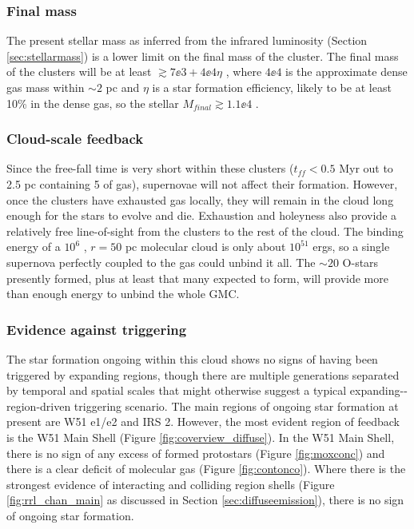 \subsubsection{Final mass}
The present stellar mass as inferred from the infrared luminosity (Section
\ref{sec:stellarmass}) is a lower limit on the final mass of the cluster.  The
final mass of the clusters will be at least $\gtrsim7\ee{3} + 4\ee{4} \eta$ \msun,
where $4\ee{4}$ \msun is the approximate dense gas mass within $\sim2$ pc and
$\eta$ is a star formation efficiency, likely to be at least 10\% in the dense
gas, so the stellar $M_{final} \gtrsim 1.1\ee{4}$ \msun.

\subsubsection{Cloud-scale feedback}
Since the free-fall time is very short within these clusters ($t_{ff} < 0.5$
Myr out to 2.5 pc containing 5 \msun of gas), supernovae will not affect
their formation.  However, once the clusters have exhausted gas locally, they
will remain in the cloud long enough for the stars to evolve and die.
Exhaustion and holeyness also provide a relatively free line-of-sight from the
clusters to the rest
of the cloud.  The binding energy of a $10^6$ \msun, $r=50$ pc 
molecular cloud is only about $10^{51}$ ergs, so a single supernova perfectly
coupled to the gas could unbind it all.  The $\sim20$ O-stars presently formed,
plus at least that many expected to form, will provide more than enough energy
to unbind the whole GMC.

\subsubsection{Evidence against triggering}
The star formation ongoing within this cloud shows no signs of having been
triggered by expanding \hii regions, though there are multiple generations
separated by temporal and spatial scales that might otherwise suggest a typical
expanding-\hii-region-driven triggering
scenario.  The main regions of ongoing star formation at present are W51 e1/e2
and IRS 2.  However, the most evident region of feedback is the W51 Main Shell
(Figure \ref{fig:coverview_diffuse}).  In the W51 Main Shell, there is no sign
of any excess of formed protostars (Figure \ref{fig:moxconc}) and there is a
clear deficit of molecular gas (Figure \ref{fig:contonco}).  Where there is the
strongest evidence of interacting and colliding \hii region shells (Figure
\ref{fig:rrl_chan_main} as discussed in Section \ref{sec:diffuseemission}),
there is no sign of ongoing star formation.


